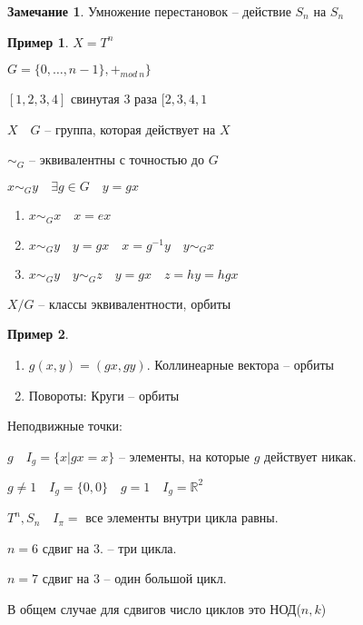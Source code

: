 \documentclass{book}
\newcommand\R{\ensuremath{\mathbb{R}}}
\theoremstyle{definition}
\newtheorem*{note}{Замечание}
\newtheorem*{example}{Пример}
\begin{document}
\begin{note}
    Умножение перестановок -- действие $S_n$ на  $S_n$
\end{note}

\begin{example}
    $X = T^n$

$G = \{0,\ldots,n-1\},+_{mod~n}\}$

$[1,2,3,4]$ свинутая 3 раза  $[2,3,4,1$
\end{example}

$X\quad G$ -- группа, которая действует на $X$

 $\sim _G$ -- эквивалентны с точностью до $G$

  $x\sim _Gy\quad \exists g\in G\quad y=gx$
  \begin{enumerate}
      \item $x\sim _Gx\quad x=ex$
      \item $x\sim_Gy\quad y=gx\quad x = g^{-1}y\quad y\sim_Gx$
      \item $x\sim _Gy\quad y\sim _Gz\quad y=gx\quad z=hy=hgx$
  \end{enumerate}

$X / G$ -- классы эквивалентности, орбиты

\begin{example}
    \begin{enumerate}
        \item $g(x,y) = (gx,gy)$. Коллинеарные вектора -- орбиты

        \item Повороты: Круги -- орбиты
    \end{enumerate}
\end{example}

\begin{definition}
    Неподвижные точки:

    $g\quad I_g = \{x|gx=x\}$ -- элементы, на которые  $g$ действует никак. 

    $g\neq 1\quad I_g=\{0,0\}\quad g=1\quad I_g = \R^2$

    $T^n, S_n\quad I_{\pi } = $ все элементы внутри цикла равны.
\end{definition}

$n=6$ сдвиг на 3. -- три цикла.

 $n=7$ сдвиг на 3 -- один большой цикл. 

 В общем случае для сдвигов число циклов это  НОД($n,k$)
\end{document}
